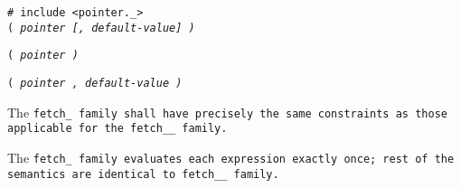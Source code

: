 
\tt{# include <pointer._>}\\

\s\s\s\tt{(} \it{pointer} [\tt{,} \it{default-value}] \tt{)}

\s\tt{(} \it{pointer} \tt{)}

\s\tt{(} \it{pointer} \phantom{[}\tt{,} \it{default-value}\phantom{]} \tt{)}


The \tt{fetch_} family shall have precisely the same
constraints as those applicable for the \tt{fetch__} family.


The \tt{fetch_} family evaluates each expression exactly once;
rest of the semantics are identical to  \tt{fetch__} family.
